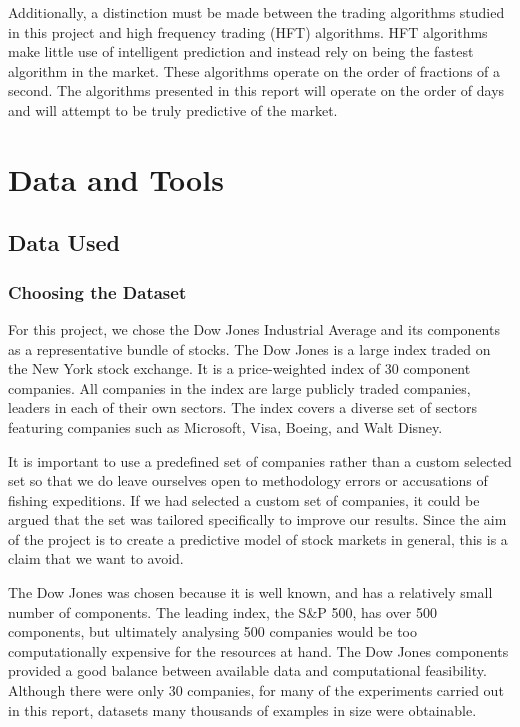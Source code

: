 \documentclass{report}
\begin{document}
Additionally, a distinction must be made between the trading algorithms studied in this project and high frequency trading (HFT) algorithms. HFT algorithms make little use of intelligent prediction and instead rely on being the fastest algorithm in the market. These algorithms operate on the order of fractions of a second. The algorithms presented in this report will operate on the order of days and will attempt to be truly predictive of the market.  

\chapter{Data and Tools}

\section{Data Used}

\subsection{Choosing the Dataset}

For this project, we chose the Dow Jones Industrial Average and its components as a representative bundle of stocks. The Dow Jones is a large index traded on the New York stock exchange. It is a price-weighted index of 30 component companies. All companies in the index are large publicly traded companies, leaders in each of their own sectors. The index covers a diverse set of sectors featuring companies such as Microsoft, Visa, Boeing, and Walt Disney.

It is important to use a predefined set of companies rather than a custom selected set so that we do leave ourselves open to methodology errors or accusations of fishing expeditions. If we had selected a custom set of companies, it could be argued that the set was tailored specifically to improve our results. Since the aim of the project is to create a predictive model of stock markets in general, this is a claim that we want to avoid. 

The Dow Jones was chosen because it is well known, and has a relatively small number of components. The leading index, the S\&P 500, has over 500 components, but ultimately analysing 500 companies would be too computationally expensive for the resources at hand. The Dow Jones components provided a good balance between available data and computational feasibility. Although there were only 30 companies,  for many of the experiments carried out in this report, datasets many thousands of examples in size were obtainable.
\end{document}
